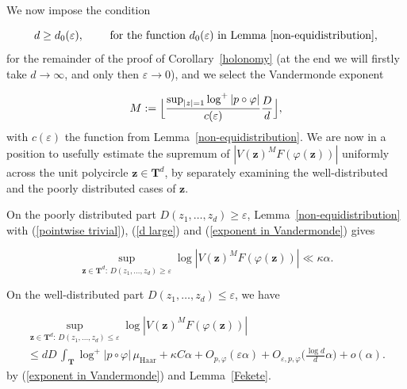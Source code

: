\documentclass[10pt]{amsart}
\def\T{\mathbf{T}}
\theoremstyle{remark}
\numberwithin{equation}{subsection}
\def\numequation{\addtocounter{subsubsection}{1}\begin{equation}}
\begin{document}
We now impose the condition
\numequation \label{d large}
d \geq d_0(\varepsilon), \quad  \quad \textrm{ for the function $d_0(\varepsilon)$ in Lemma~\ref{non-equidistribution}},
\end{equation}
for the remainder of the proof of Corollary~\ref{holonomy} (at the end we will firstly take $d \to \infty$, and only then $\varepsilon \to 0$), 
and we
 select the Vandermonde exponent
\numequation \label{exponent in Vandermonde}
M := \Bigl\lfloor \frac{\sup_{|z| = 1} \log^+{|p \circ \varphi|}}{c(\varepsilon)} \frac{D}{d} \Bigr\rfloor,
\end{equation}
with $c(\varepsilon)$ the function from Lemma~\ref{non-equidistribution}. We are now in a position to usefully
 estimate the supremum of $|V(\mathbf{z})^M F(\varphi(\mathbf{z}))|$ uniformly across the unit 
polycircle $\mathbf{z} \in \T^d$, by separately examining the well-distributed and the poorly distributed cases 
of $\mathbf{z}$. 

On the poorly distributed part  $D(z_1, \ldots, z_d) \geq \varepsilon$, Lemma~\ref{non-equidistribution} with (\ref{pointwise trivial}),  (\ref{d large}) and (\ref{exponent in Vandermonde}) gives
\numequation \label{biased part}
\sup_{\mathbf{z} \in \T^d: \, D(z_1, \ldots, z_d) \geq \varepsilon} \log{ |V(\mathbf{z})^MF( \varphi(\mathbf{z}))|  } \ll \kappa \alpha. 
\end{equation}


On the well-distributed part $D(z_1, \ldots, z_d) \leq \varepsilon$, we have 
\numequation
\begin{split}
\label{balanced part}
\sup_{\mathbf{z} \in \T^d: \, D(z_1, \ldots, z_d) \leq \varepsilon} \log{ |V(\mathbf{z})^M F(\varphi(\mathbf{z}))|  }  \\ \leq
  d D  \,  \int_{\T} \log^+{ |p \circ \varphi|}  \, \mu_{\mathrm{Haar}}
+ \kappa C \alpha  + O_{p,\varphi} (\varepsilon \alpha) + O_{\varepsilon, p,\varphi}\Big(\frac{\log{d}}{d} \alpha \Big)  + o(\alpha).
\end{split}
\end{equation}
 by (\ref{exponent in Vandermonde}) and Lemma~\ref{Fekete}. 
\end{document}
